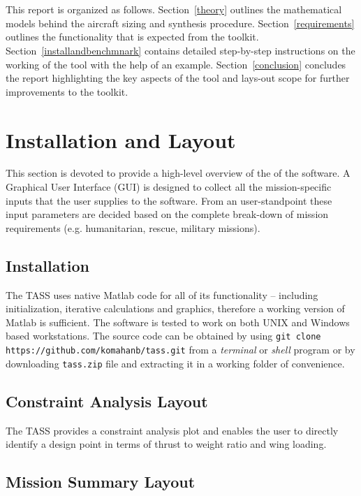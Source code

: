 \documentclass[pdftex,11pt,letter]{article}
\begin{document}
\\\\
This report is organized as follows. Section~\ref{theory} outlines the mathematical models behind the aircraft sizing and synthesis procedure. Section~\ref{requirements} outlines the functionality that is expected from the toolkit. Section~\ref{installandbenchmnark} contains detailed step-by-step instructions on the working of the tool with the help of an example. Section~\ref{conclusion} concludes the report highlighting the key aspects of the tool and lays-out scope for further improvements to the toolkit. 


\section{Installation and Layout}\label{layout}
This section is devoted to provide a high-level overview of the of the software. A Graphical User Interface (GUI) is designed to collect all the mission-specific inputs that the user supplies to the software. From an user-standpoint these input parameters are decided based on the complete break-down of mission requirements (e.g. humanitarian, rescue, military missions). 

\subsection{Installation}
The TASS uses native Matlab code for all of its functionality -- including initialization, iterative calculations and graphics, therefore a working version of Matlab\cite{MATLAB} is sufficient. The software is tested to work on both UNIX and Windows based workstations. The source code can be obtained by using \texttt{git clone https://github.com/komahanb/tass.git} from a \textit{terminal} or \textit{shell} program or by downloading \texttt{tass.zip} file and extracting it in a working folder of convenience. 


\subsection{Constraint Analysis Layout}

The  TASS provides  a constraint analysis plot and enables the user to directly identify a design point in terms of thrust to weight ratio and wing loading.

\subsection{Mission Summary Layout}
\end{document}
